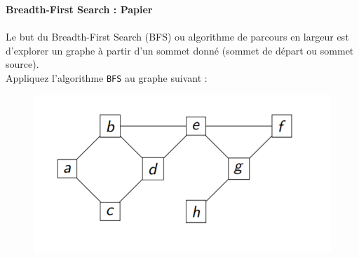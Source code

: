 \begin{Exercice}[10 minutes]\textbf{Breadth-First Search : Papier
}\\
\\
	Le but du Breadth-First Search (BFS) ou algorithme de parcours en largeur est d'explorer un graphe à partir d’un sommet donné (sommet de départ ou sommet source). \\

	Appliquez l’algorithme \lstinline{BFS} au graphe suivant :\\

	\begin{figure}[h!]
        		\centering
       	 	\includegraphics[]{resources/exerciceBFS.png}
	\end{figure}



\end{Exercice}
